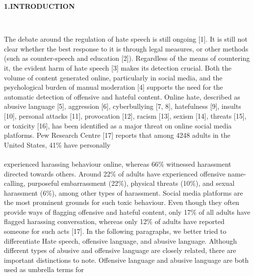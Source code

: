 \documentclass{letter}
\begin{document}
\begin{multicols}{2}
\begin{large}\textbf{1.INTRODUCTION}\end{large}\\ \begin{normalsize}
The debate around the regulation of hate speech is still 
ongoing [1]. It is still not clear whether the best response 
to it is through legal measures, or other methods (such 
as counter-speech and education [2]). Regardless of the 
means of countering it, the evident harm of hate speech 
[3] makes its detection crucial. Both the volume of 
content generated online, particularly in social media, 
and the psychological burden of manual moderation [4] 
supports the need for the automatic detection of 
offensive and hateful content.
Online hate, described as abusive language [5], 
aggression [6], cyberbullying [7, 8], hatefulness [9], 
insults [10], personal attacks [11], provocation [12], 
racism [13], sexism [14], threats [15], or toxicity [16], has 
been identified as a major threat on online social media 
platforms. Pew Research Centre [17] reports that among 
4248 adults in the United States, 41\% have personally \\ \\
experienced harassing behaviour online, whereas 66\% 
witnessed harassment directed towards others. Around 
22\% of adults have experienced
offensive name-calling, purposeful embarrassment 
(22\%), physical threats (10\%), and sexual harassment 
(6\%), among other types of harassment. Social media 
platforms are the most prominent grounds for such 
toxic behaviour. Even though they often provide ways 
of flagging offensive and hateful content, only 17\% of all 
adults have flagged harassing conversation, whereas 
only 12\% of adults have reported someone for such acts 
[17]. 
In the following paragraphs, we better tried to 
differentiate Hate speech, offensive language, and 
abusive language. Although different types of abusive 
and offensive language are closely related, there are 
important distinctions to note. Offensive language and 
abusive language are both used as umbrella terms for
\end{normalsize}
\end{multicols}

\pagestyle{fancy}
\lfoot{ {\noindent\rule{7in}{2pt}} \\ \textbf{ \thepage \hspace{0.4cm}  {\textcolor{red}{International Journal for Modern Trends in Science and Technology}}}}
\end{document}
